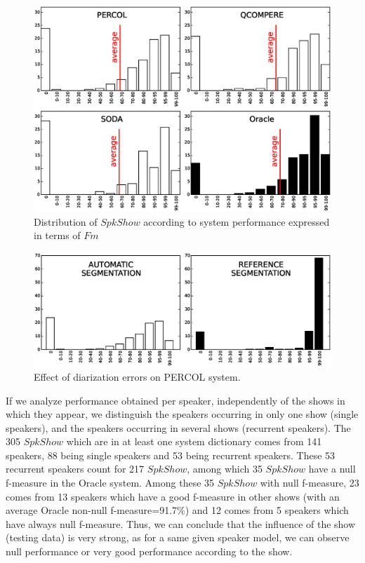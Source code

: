 \begin{figure}[t]
\centering
\includegraphics[width=\linewidth]{figures/bimodal.eps}
\caption{Distribution of $SpkShow$ according to system performance expressed in terms of $Fm$}
\label{fig:FMeasureDistribution}
\end{figure}


\begin{figure}[t]
\centering
\includegraphics[width=\linewidth]{figures/ref.eps}
\caption{Effect of diarization errors on PERCOL system.}
\label{fig:autoVSref}
\end{figure}

If we analyze performance obtained per speaker, independently of the shows in which they appear, we distinguish the speakers occurring in only one show (single speakers), and the speakers occurring in several shows (recurrent speakers). The 305 $SpkShow$ which are in at least one system dictionary comes from 141 speakers, 88 being single speakers and 53 being recurrent speakers. These 53 recurrent speakers count for 217 $SpkShow$, among which 35 $SpkShow$ have a null f-measure in the Oracle system. Among these 35 $SpkShow$ with null f-measure, 23 comes from 13 speakers which have a good f-measure in other shows (with an average Oracle non-null f-measure=91.7\%) and 12 comes from 5 speakers which have always null f-measure. Thus, we can conclude that the influence of the show (testing data) is very strong, as for a same given speaker model, we can observe null performance or very good performance according to the show.
 
